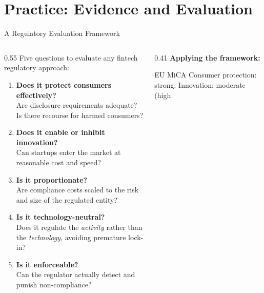 
\section{Practice: Evidence and Evaluation}

\begin{frame}{A Regulatory Evaluation Framework}
  \begin{columns}[T]
    \begin{column}{0.55\textwidth}
      Five questions to evaluate any fintech regulatory approach:
      \vspace{0.4em}
      \begin{enumerate}
        \item \textbf{Does it protect consumers effectively?}\\
              Are disclosure requirements adequate? Is there recourse
              for harmed consumers?
        \item \textbf{Does it enable or inhibit innovation?}\\
              Can startups enter the market at reasonable cost and speed?
        \item \textbf{Is it proportionate?}\\
              Are compliance costs scaled to the risk and size of the
              regulated entity?
        \item \textbf{Is it technology-neutral?}\\
              Does it regulate the \textit{activity} rather than the
              \textit{technology}, avoiding premature lock-in?
        \item \textbf{Is it enforceable?}\\
              Can the regulator actually detect and punish non-compliance?
      \end{enumerate}
    \end{column}
    \begin{column}{0.41\textwidth}
      \textbf{Applying the framework:}
      \vspace{0.3em}
      \begin{block}{EU MiCA}
        Consumer protection: strong. Innovation: moderate (high

\end{block}
\end{column}
\end{columns}
\end{frame}
